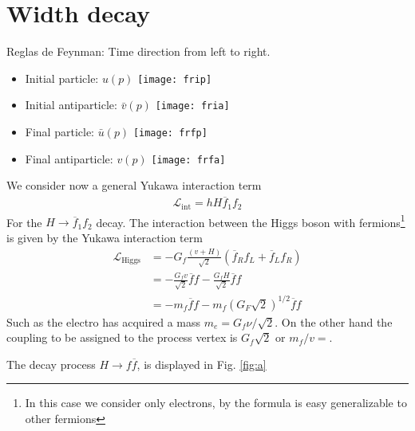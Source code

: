 \section{Width decay}
\label{sec:width-decay}

Reglas de Feynman: Time direction from left to right.
\begin{itemize}
\item Initial particle: ${u}(p)$ \texttt{[image: frip]}
\item Initial antiparticle: $\bar{v}(p)$ \texttt{[image: fria]}
\item Final particle: $\bar{u}(p)$ \texttt{[image: frfp]}
\item Final antiparticle: ${v}(p)$ \texttt{[image: frfa]}

\end{itemize}

We consider now a general Yukawa interaction term
\begin{align}
  \mathcal{L}_{\text{int}}=hH\overline{f}_1 f_2
\end{align}
For the $H\to \overline{f}_1f_2$ decay.
The interaction between the Higgs boson with fermions\footnote{In this case we consider only electrons, by the formula is easy generalizable to other fermions} is given by the Yukawa interaction term \cite{lsm}
\begin{align}
\label{eq:155l}
\mathcal{L}_{\text{Higgs}}&=-G_{f}\frac{(v+H)}{\sqrt{2}}(\overline{f}_{R}f_{L}+\overline{f}_{L}f_{R})\nonumber\\
&=-\frac{G_{f}v}{\sqrt{2}}\overline{f}f-\frac{G_{f}H}{\sqrt{2}}\overline{f}f\nonumber\\
&=-m_f\overline{f}f-m_f\left(G_{F}\sqrt{2}\right)^{1/2}\overline{f}f
\end{align}
Such as the electro has acquired a mass $m_{e}=G_{f}\nu/\sqrt{2}$. On the other hand the coupling to be assigned to the process vertex is 
$G_{f}\sqrt{2}$ or $m_{f}/v=$. 

The decay process $H\to f\overline{f}$, is displayed in Fig. 
\ref{fig:a} %

